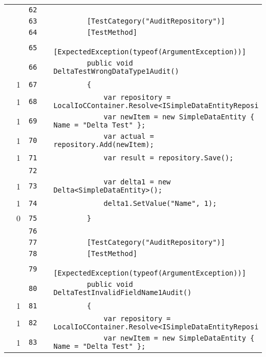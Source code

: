 \documentclass[a4paper,10pt]{article}
\begin{document}
\begin{longtable}[l]{lrrll}
\cellcolor{gray} &  & \verb~62~ & & \verb~~\\
\cellcolor{gray} &  & \verb~63~ & & \verb~        [TestCategory("AuditRepository")]~\\
\cellcolor{gray} &  & \verb~64~ & & \verb~        [TestMethod]~\\
\cellcolor{gray} &  & \verb~65~ & & \verb~        [ExpectedException(typeof(ArgumentException))]~\\
\cellcolor{gray} &  & \verb~66~ & & \verb~        public void DeltaTestWrongDataType1Audit()~\\
\cellcolor{green} & 1 & \verb~67~ & & \verb~        {~\\
\cellcolor{green} & 1 & \verb~68~ & & \verb~            var repository = LocalIoCContainer.Resolve<ISimpleDataEntityReposi~\\
\cellcolor{green} & 1 & \verb~69~ & & \verb~            var newItem = new SimpleDataEntity { Name = "Delta Test" };~\\
\cellcolor{green} & 1 & \verb~70~ & & \verb~            var actual = repository.Add(newItem);~\\
\cellcolor{green} & 1 & \verb~71~ & & \verb~            var result = repository.Save();~\\
\cellcolor{gray} &  & \verb~72~ & & \verb~~\\
\cellcolor{green} & 1 & \verb~73~ & & \verb~            var delta1 = new Delta<SimpleDataEntity>();~\\
\cellcolor{green} & 1 & \verb~74~ & & \verb~            delta1.SetValue("Name", 1);~\\
\cellcolor{red} & 0 & \verb~75~ & & \verb~        }~\\
\cellcolor{gray} &  & \verb~76~ & & \verb~~\\
\cellcolor{gray} &  & \verb~77~ & & \verb~        [TestCategory("AuditRepository")]~\\
\cellcolor{gray} &  & \verb~78~ & & \verb~        [TestMethod]~\\
\cellcolor{gray} &  & \verb~79~ & & \verb~        [ExpectedException(typeof(ArgumentException))]~\\
\cellcolor{gray} &  & \verb~80~ & & \verb~        public void DeltaTestInvalidFieldName1Audit()~\\
\cellcolor{green} & 1 & \verb~81~ & & \verb~        {~\\
\cellcolor{green} & 1 & \verb~82~ & & \verb~            var repository = LocalIoCContainer.Resolve<ISimpleDataEntityReposi~\\
\cellcolor{green} & 1 & \verb~83~ & & \verb~            var newItem = new SimpleDataEntity { Name = "Delta Test" };~\\

\end{longtable}
\end{document}
